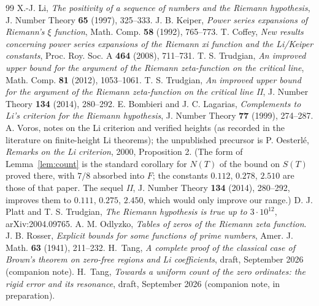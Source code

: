 \documentclass[11pt]{article}
\theoremstyle{remark}
\begin{document}
\begin{thebibliography}{99}
 X.-J. Li, \emph{The positivity of a sequence of numbers and the Riemann
hypothesis}, J. Number Theory \textbf{65} (1997), 325--333.
 J. B. Keiper, \emph{Power series expansions of Riemann's $\xi$ function},
Math. Comp. \textbf{58} (1992), 765--773.
 T. Coffey, \emph{New results concerning power series expansions of the Riemann
xi function and the Li/Keiper constants}, Proc. Roy. Soc. A \textbf{464} (2008), 711--731.
 T. S. Trudgian, \emph{An improved upper bound for the argument of the Riemann
zeta-function on the critical line}, Math. Comp. \textbf{81} (2012), 1053--1061.
 T. S. Trudgian, \emph{An improved upper bound for the argument of the Riemann
zeta-function on the critical line II}, J. Number Theory \textbf{134} (2014), 280--292.
 E. Bombieri and J. C. Lagarias, \emph{Complements to Li's criterion for
the Riemann hypothesis}, J. Number Theory \textbf{77} (1999), 274--287.
 A. Voros, notes on the Li criterion and verified heights (as recorded in the
literature on finite-height Li theorems); the unpublished precursor is P. Oesterl\'e, \emph{Remarks
on the Li criterion}, 2000, Proposition 2. (The form of
Lemma~\ref{lem:count} is the standard corollary for $N(T)$ of the bound on $S(T)$ proved there, with
$7/8$ absorbed into $F$; the constants $0.112$, $0.278$, $2.510$ are those of that paper. The sequel
\emph{II}, J. Number Theory \textbf{134} (2014), 280--292, improves them to $0.111$, $0.275$,
$2.450$, which would only improve our range.)
 D. J. Platt and T. S. Trudgian, \emph{The Riemann hypothesis is true up to
$3\cdot10^{12}$}, arXiv:2004.09765.
 A. M. Odlyzko, \emph{Tables of zeros of the Riemann zeta function}.
 J. B. Rosser, \emph{Explicit bounds for some functions of prime numbers},
Amer. J. Math. \textbf{63} (1941), 211--232.
 H.~Tang, \emph{A complete proof of the classical case of Brown's theorem on
zero-free regions and Li coefficients}, draft, September 2026 (companion note).
 H.~Tang, \emph{Towards a uniform count of the zero ordinates: the rigid error and
its resonance}, draft, September 2026 (companion note, in preparation).
\end{thebibliography}
\end{document}
